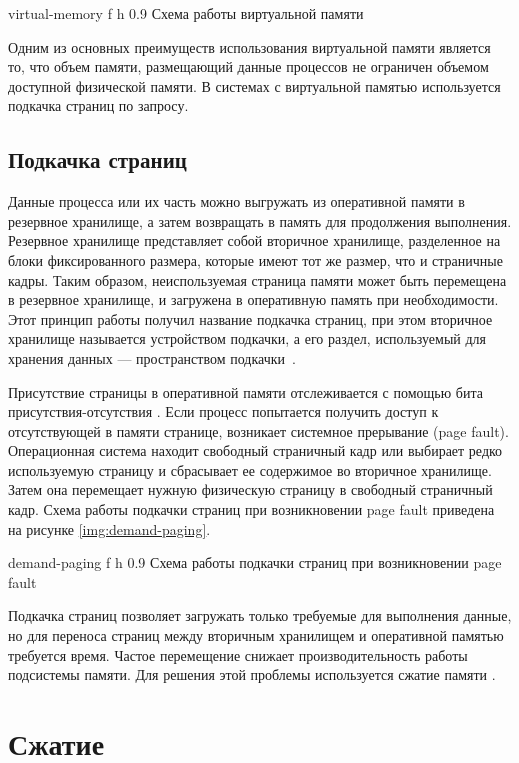     {virtual-memory}
    {f}
    {h}
    {0.9\textwidth}
    {Схема работы виртуальной памяти}
    
Одним из основных преимуществ использования виртуальной памяти является то, что объем памяти, размещающий данные процессов не ограничен объемом доступной физической памяти. В системах с виртуальной памятью используется подкачка страниц по запросу.

\subsection{Подкачка страниц}

Данные процесса или их часть можно выгружать из оперативной памяти в резервное хранилище, а затем возвращать в память для продолжения выполнения. Резервное хранилище представляет собой вторичное хранилище, разделенное на блоки фиксированного размера, которые имеют тот же размер, что и страничные кадры. Таким образом, неиспользуемая страница памяти может быть перемещена в резервное хранилище, и загружена в оперативную память при необходимости. Этот принцип работы получил название подкачка страниц, при этом вторичное хранилище называется устройством подкачки, а его раздел, используемый для хранения данных --- пространством подкачки~\cite{swapping}.

Присутствие страницы в оперативной памяти отслеживается с помощью бита присутствия-отсутствия \cite{address-space}. Если процесс попытается получить доступ к отсутствующей в памяти странице, возникает системное прерывание (page fault). Операционная система находит свободный страничный кадр или выбирает редко используемую страницу и сбрасывает ее содержимое во вторичное хранилище. Затем она перемещает нужную физическую страницу в свободный страничный кадр. Схема работы подкачки страниц при возникновении page fault приведена на рисунке \ref{img:demand-paging}.

    {demand-paging}
    {f}
    {h}
    {0.9\textwidth}
    {Схема работы подкачки страниц при возникновении page fault}
    
Подкачка страниц позволяет загружать только требуемые для выполнения данные, но для переноса страниц между вторичным хранилищем и оперативной памятью требуется время. Частое перемещение снижает производительность работы подсистемы памяти. Для решения этой проблемы используется сжатие памяти \cite{swapping-problem}.

\section{Сжатие}\label{compression}

